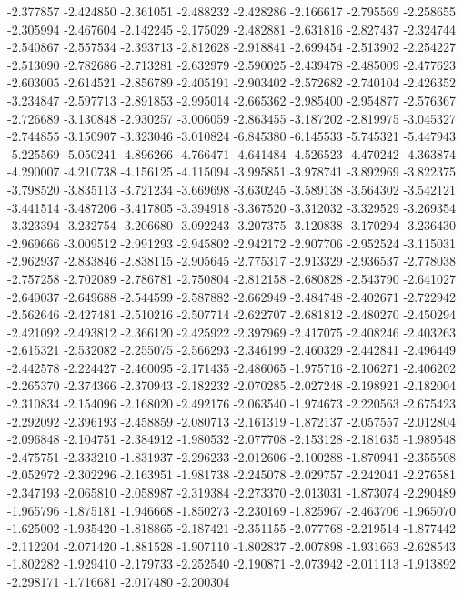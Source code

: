 -2.377857
-2.424850
-2.361051
-2.488232
-2.428286
-2.166617
-2.795569
-2.258655
-2.305994
-2.467604
-2.142245
-2.175029
-2.482881
-2.631816
-2.827437
-2.324744
-2.540867
-2.557534
-2.393713
-2.812628
-2.918841
-2.699454
-2.513902
-2.254227
-2.513090
-2.782686
-2.713281
-2.632979
-2.590025
-2.439478
-2.485009
-2.477623
-2.603005
-2.614521
-2.856789
-2.405191
-2.903402
-2.572682
-2.740104
-2.426352
-3.234847
-2.597713
-2.891853
-2.995014
-2.665362
-2.985400
-2.954877
-2.576367
-2.726689
-3.130848
-2.930257
-3.006059
-2.863455
-3.187202
-2.819975
-3.045327
-2.744855
-3.150907
-3.323046
-3.010824
-6.845380
-6.145533
-5.745321
-5.447943
-5.225569
-5.050241
-4.896266
-4.766471
-4.641484
-4.526523
-4.470242
-4.363874
-4.290007
-4.210738
-4.156125
-4.115094
-3.995851
-3.978741
-3.892969
-3.822375
-3.798520
-3.835113
-3.721234
-3.669698
-3.630245
-3.589138
-3.564302
-3.542121
-3.441514
-3.487206
-3.417805
-3.394918
-3.367520
-3.312032
-3.329529
-3.269354
-3.323394
-3.232754
-3.206680
-3.092243
-3.207375
-3.120838
-3.170294
-3.236430
-2.969666
-3.009512
-2.991293
-2.945802
-2.942172
-2.907706
-2.952524
-3.115031
-2.962937
-2.833846
-2.838115
-2.905645
-2.775317
-2.913329
-2.936537
-2.778038
-2.757258
-2.702089
-2.786781
-2.750804
-2.812158
-2.680828
-2.543790
-2.641027
-2.640037
-2.649688
-2.544599
-2.587882
-2.662949
-2.484748
-2.402671
-2.722942
-2.562646
-2.427481
-2.510216
-2.507714
-2.622707
-2.681812
-2.480270
-2.450294
-2.421092
-2.493812
-2.366120
-2.425922
-2.397969
-2.417075
-2.408246
-2.403263
-2.615321
-2.532082
-2.255075
-2.566293
-2.346199
-2.460329
-2.442841
-2.496449
-2.442578
-2.224427
-2.460095
-2.171435
-2.486065
-1.975716
-2.106271
-2.406202
-2.265370
-2.374366
-2.370943
-2.182232
-2.070285
-2.027248
-2.198921
-2.182004
-2.310834
-2.154096
-2.168020
-2.492176
-2.063540
-1.974673
-2.220563
-2.675423
-2.292092
-2.396193
-2.458859
-2.080713
-2.161319
-1.872137
-2.057557
-2.012804
-2.096848
-2.104751
-2.384912
-1.980532
-2.077708
-2.153128
-2.181635
-1.989548
-2.475751
-2.333210
-1.831937
-2.296233
-2.012606
-2.100288
-1.870941
-2.355508
-2.052972
-2.302296
-2.163951
-1.981738
-2.245078
-2.029757
-2.242041
-2.276581
-2.347193
-2.065810
-2.058987
-2.319384
-2.273370
-2.013031
-1.873074
-2.290489
-1.965796
-1.875181
-1.946668
-1.850273
-2.230169
-1.825967
-2.463706
-1.965070
-1.625002
-1.935420
-1.818865
-2.187421
-2.351155
-2.077768
-2.219514
-1.877442
-2.112204
-2.071420
-1.881528
-1.907110
-1.802837
-2.007898
-1.931663
-2.628543
-1.802282
-1.929410
-2.179733
-2.252540
-2.190871
-2.073942
-2.011113
-1.913892
-2.298171
-1.716681
-2.017480
-2.200304
